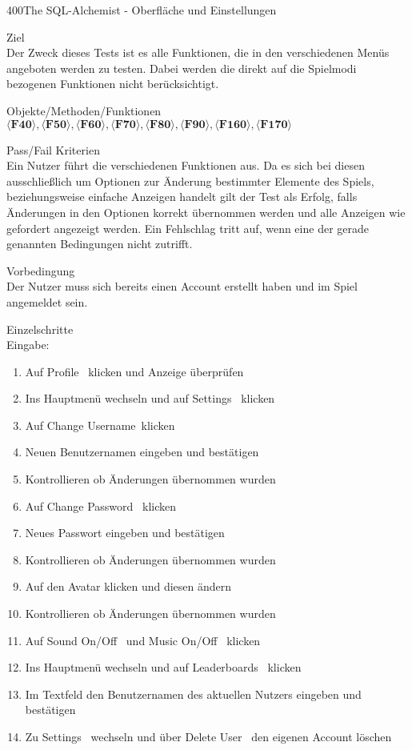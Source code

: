 \begin{testcase}{400}{The SQL-Alchemist - Oberfläche und Einstellungen}

\item[Ziel]~\\
Der Zweck dieses Tests ist es alle Funktionen, die in den verschiedenen Menüs angeboten werden zu testen. Dabei werden die direkt auf die Spielmodi bezogenen Funktionen nicht berücksichtigt.

\item[Objekte/Methoden/Funktionen]~\\
$\langle\textbf{F40}\rangle, \langle\textbf{F50}\rangle, \langle\textbf{F60}\rangle, \langle\textbf{F70}\rangle, \langle\textbf{F80}\rangle, \langle\textbf{F90}\rangle, \langle\textbf{F160}\rangle, \langle\textbf{F170}\rangle$ 

\item[Pass/Fail Kriterien]~\\
Ein Nutzer führt die verschiedenen Funktionen aus. Da es sich bei diesen ausschließlich um Optionen zur Änderung bestimmter Elemente des Spiels, beziehungsweise einfache Anzeigen handelt gilt der Test als Erfolg, falls Änderungen in den Optionen korrekt übernommen werden und alle Anzeigen wie gefordert angezeigt werden. Ein Fehlschlag tritt auf, wenn eine der gerade genannten Bedingungen nicht zutrifft.

\item[Vorbedingung]~\\
Der Nutzer muss sich bereits einen Account erstellt haben und im Spiel angemeldet sein.

\item[Einzelschritte]~\\

Eingabe:
\begin{enumerate}
\item Auf \glqq Profile \grqq~klicken und Anzeige überprüfen
\item Ins Hauptmenü wechseln und auf \glqq Settings \grqq~klicken
\item Auf \glqq Change Username\grqq~klicken
\item Neuen Benutzernamen eingeben und bestätigen
\item Kontrollieren ob Änderungen übernommen wurden 
\item Auf \glqq Change Password \grqq~klicken
\item Neues Passwort eingeben und bestätigen
\item Kontrollieren ob Änderungen übernommen wurden
\item Auf den Avatar klicken und diesen ändern
\item Kontrollieren ob Änderungen übernommen wurden
\item Auf \glqq Sound On/Off \grqq~und \glqq Music On/Off \grqq~klicken 
\item Ins Hauptmenü wechseln und auf \glqq Leaderboards \grqq~klicken
\item Im Textfeld den Benutzernamen des aktuellen Nutzers eingeben und bestätigen
\item Zu  \glqq Settings \grqq~wechseln und über \glqq Delete User \grqq~den eigenen Account löschen
\end{enumerate}



\end{testcase}
